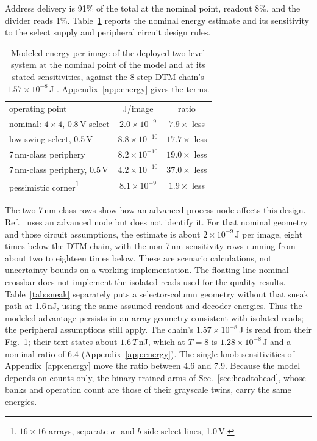 \documentclass[reprint,amsmath,amssymb,aps,nofootinbib]{revtex4-2}
\begin{document}
Address delivery is 91\% of the total at the nominal point, readout
8\%, and the divider reads 1\%. Table~\ref{tab:energy} reports the nominal energy estimate and its
sensitivity to the select supply and peripheral circuit design rules.
\begin{table}
\caption{Modeled energy per image of the deployed two-level system at
the nominal point of the model and at its stated sensitivities,
against the 8-step DTM chain's $1.57\times10^{-8}$\,J
\cite{jelincic2025dtm}. Appendix~\ref{app:energy} gives the terms.
\label{tab:energy}}
\begin{ruledtabular}
\begin{tabular}{lcc}
operating point & J/image & ratio \\
\colrule
nominal: $4 \times 4$, 0.8\,V select & $2.0\times10^{-9}$ &
  $7.9\times$ less \\
low-swing select, 0.5\,V & $8.8\times10^{-10}$ & $17.7\times$ less \\
7\,nm-class periphery & $8.2\times10^{-10}$ & $19.0\times$ less \\
7\,nm-class periphery, 0.5\,V & $4.2\times10^{-10}$ & $37.0\times$ less \\
pessimistic corner\footnote{$16 \times 16$ arrays, separate $a$- and
  $b$-side select lines, 1.0\,V.} & $8.1\times10^{-9}$ &
  $1.9\times$ less \\
\end{tabular}
\end{ruledtabular}
\end{table}
The two 7\,nm-class rows show how an advanced process node affects this
design. Ref.~\cite{jelincic2025dtm} uses an advanced node but does not
identify it. For that nominal geometry and those circuit assumptions, the estimate is about $2\times10^{-9}$\,J per
image, eight times below the DTM chain, with the non-7\,nm sensitivity rows
running from about two to eighteen times below. These are scenario
calculations, not uncertainty bounds on a working implementation. The
floating-line nominal crossbar does not implement the isolated reads
used for the quality results. Table~\ref{tab:sneak} separately puts
a selector-column geometry without that sneak path at 1.6\,nJ,
using the same assumed readout and decoder energies. Thus the modeled
advantage persists in an array geometry consistent with isolated
reads; the peripheral assumptions still apply. The chain's
$1.57\times10^{-8}$\,J is read from their Fig.~1; their text states
about $1.6\,T$\,nJ, which at $T = 8$ is $1.28\times10^{-8}$\,J and a
nominal ratio of 6.4 (Appendix~\ref{app:energy}). The single-knob
sensitivities of Appendix~\ref{app:energy} move the ratio between 4.6
and 7.9. Because the model depends on counts only, the binary-trained
arms of Sec.~\ref{sec:headtohead}, whose banks and operation count are those of
their grayscale twins, carry the same energies.
\end{document}
